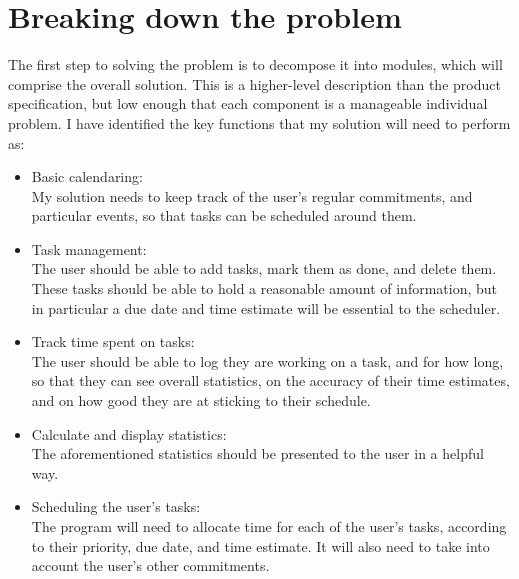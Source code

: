 \documentclass{article}
\begin{document}
\section{Breaking down the problem}
The first step to solving the problem is to decompose it into modules,
which will comprise the overall solution.
This is a higher-level description than the product specification,
but low enough that each component is a manageable individual problem.
I have identified the key functions that my solution will need to perform as:
\begin{itemize}
	\item Basic calendaring:\\
	      My solution needs to keep track of the user's regular commitments,
	      and particular events,
	      so that tasks can be scheduled around them.
	\item Task management:\\
	      The user should be able to add tasks,
	      mark them as done,
	      and delete them.
	      These tasks should be able to hold a reasonable amount of information,
	      but in particular a due date and time estimate will be essential to the scheduler.
	\item Track time spent on tasks:\\
	      The user should be able to log they are working on a task,
	      and for how long,
	      so that they can see overall statistics,
	      on the accuracy of their time estimates,
	      and on how good they are at sticking to their schedule.
	\item Calculate and display statistics:\\
	      The aforementioned statistics should be presented to the user in a helpful way.
	\item Scheduling the user's tasks:\\
	      The program will need to allocate time for each of the user's tasks,
	      according to their priority,
	      due date,
	      and time estimate.
	      It will also need to take into account the user's other commitments.
\end{itemize}
\end{document}
